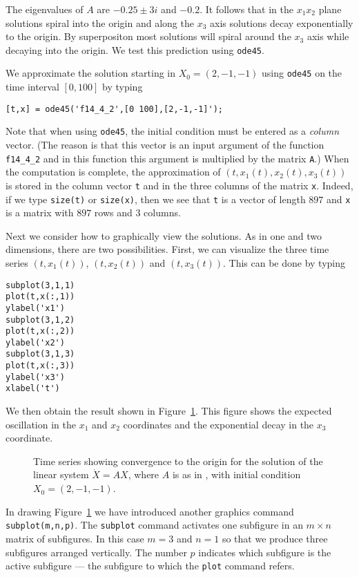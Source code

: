 The eigenvalues of $A$ are $-0.25\pm 3i$ and $-0.2$.  It follows that in the 
$x_1x_2$ plane solutions spiral into the origin and along the $x_3$ axis 
solutions decay exponentially to the origin.  By superpositon most solutions
will spiral around the $x_3$ axis while decaying into the origin.  We test 
this prediction using {\tt ode45}.

We approximate the solution starting in $X_0=(2,-1,-1)$ using
{\tt ode45} on the time interval $[0,100]$ by typing
\begin{verbatim}
[t,x] = ode45('f14_4_2',[0 100],[2,-1,-1]');
\end{verbatim}
Note that when using {\tt ode45}, the 
initial condition must be entered 
as a {\em column\/} vector.   (The reason is that this vector is an
input argument of the function {\tt f14\_4\_2} and in this function
this argument is multiplied by the matrix {\tt A}.)  When the computation 
is complete, 
the approximation of $(t,x_1(t),x_2(t),x_3(t))$ is stored in the column 
vector {\tt t} and in the three columns of the matrix {\tt x}.  Indeed, if 
we type {\tt size(t)} or {\tt size(x)}, then we see that {\tt t} is a 
vector of length $897$ and {\tt x} is a matrix with $897$ rows and $3$ 
columns.  

Next we consider how to graphically view the solutions.  As in one and
two dimensions, there are two possibilities.  First, we can visualize 
the three time series 
$(t,x_1(t))$, $(t,x_2(t))$ and $(t,x_3(t))$.  
This can be done by typing
\begin{verbatim}
subplot(3,1,1)
plot(t,x(:,1))
ylabel('x1')
subplot(3,1,2)
plot(t,x(:,2))
ylabel('x2')
subplot(3,1,3)
plot(t,x(:,3))
ylabel('x3')
xlabel('t')
\end{verbatim}
We then obtain the result shown in Figure~\ref{fig:flinear1}.  This figure 
shows the expected oscillation in the $x_1$ and $x_2$ coordinates and the 
exponential decay in the $x_3$ coordinate.
\begin{figure}[htb]
   \centerline{%
   }
   \caption{Time series showing convergence to the origin for the solution 
	of the linear system $\dot X=AX$, where $A$ is as in 
	\protect{}, with initial condition $X_0=(2,-1,-1)$.}
   \label{fig:flinear1}
\end{figure}

In drawing Figure~\ref{fig:flinear1} we have introduced another \Matlab 
graphics command {\tt subplot(m,n,p)}.  
The {\tt subplot} command activates one 
subfigure in an $m\times n$ matrix of subfigures.  In this case $m=3$ 
and $n=1$ so that we produce three subfigures arranged vertically.  
The number $p$ indicates which subfigure is the active subfigure --- the 
subfigure to which the {\tt plot} command refers.

